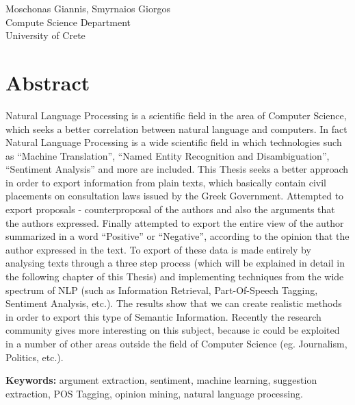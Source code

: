 Moschonas Giannis, Smyrnaios Giorgos\\
Compute Science Department\\
University of Crete \setlength{\parskip}{0.5cm}

\thispagestyle{plain}			%
\setlength{\parskip}{0pt plus 1.0pt}
\section*{Abstract}
Natural Language Processing is a scientific field in the area of Computer Science, which seeks a better correlation between natural language and computers. In fact Natural Language Processing is a wide scientific field in which technologies such as ``Machine Translation'', ``Named Entity Recognition and Disambiguation'', ``Sentiment Analysis'' and more are included. This Thesis seeks a better approach in order to export information from plain texts, which basically contain civil placements on consultation laws issued by the Greek Government. Attempted to export proposals - counterproposal of the authors and also the arguments that the authors expressed. Finally attempted to export the entire view of the author summarized in a word ``Positive'' or ``Negative'', according to the opinion that the author expressed in the text. To export of these data is made entirely by analysing texts through a three step process (which will be explained in detail in the following chapter of this Thesis) and implementing techniques from the wide spectrum of NLP (such as Information Retrieval, Part-Of-Speech Tagging, Sentiment Analysis, etc.). The results show that we can create realistic methods in order to export this type of Semantic Information. Recently the research community gives more interesting on this subject, because ic could be exploited in a number of other areas outside the field of Computer Science (eg. Journalism, Politics, etc.).





\vfill
\textbf{Keywords:} argument extraction, sentiment, machine learning, suggestion extraction, POS Tagging, opinion mining, natural language processing.
